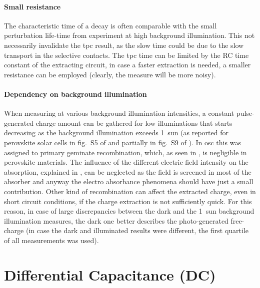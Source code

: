 \paragraph{Small resistance}
The characteristic time of a  decay is often comparable with the small perturbation life\hyp{}time from  experiment at high background illumination.
This not necessarily invalidate the \gls{tpc} result, as the slow time could be due to the slow transport in the selective contacts.
The \gls{tpc} time can be limited by the RC time constant of the extracting circuit, in case a faster extraction is needed, a smaller resistance can be employed (clearly, the measure will be more noisy).

	\paragraph{Dependency on background illumination}\label{tpc_intensity}
	When measuring  at various background illumination intensities, a constant pulse\hyp{}generated charge amount can be gathered for low illuminations that starts decreasing as the background illumination exceeds \SI{1}{sun} (as reported for perovskite solar cells in fig.~S5 of \cite{Du2018} and partially in fig.~S9 of \cite{Wheeler2017}).
	In \gls{osc} this was assigned to primary geminate recombination, which, as seen in , is negligible in perovskite materials.
	The influence of the different electric field intensity on the absorption, explained in , can be neglected as the field is screened in most of the absorber and anyway the electro absorbance phenomena should have just a small contribution.
	Other kind of recombination can affect the extracted charge, even in short circuit conditions, if the charge extraction is not sufficiently quick.
	For this reason, in case of large discrepancies between the dark and the \SI{1}{sun} background illumination measures, the dark one better describes the photo\hyp{}generated free\hyp{}charge (in case the dark and illuminated results were different, the first quartile of all  measurements was used).

\FloatBarrier
\newpage
\section{Differential Capacitance (DC)}

